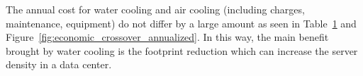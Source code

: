                 \begin{figure}[h!tb]
                    \centering
                    \label{tab:life_cycle_costs_water_cooled_air_cooled}
                \end{figure}
                The annual cost for water cooling and air cooling (including charges, maintenance, equipment) do not differ by a large amount as seen in Table~\ref{tab:life_cycle_costs_water_cooled_air_cooled} and Figure~\ref{fig:economic_crossover_annualized}. In this way, the main benefit brought by water cooling is the footprint reduction which can increase the server density in a data center.

